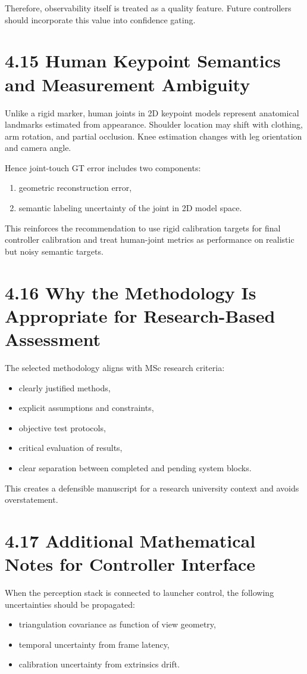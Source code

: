 Therefore, observability itself is treated as a quality feature. Future controllers should incorporate this value into confidence gating.

\section{4.15 Human Keypoint Semantics and Measurement Ambiguity}
Unlike a rigid marker, human joints in 2D keypoint models represent anatomical landmarks estimated from appearance. Shoulder location may shift with clothing, arm rotation, and partial occlusion. Knee estimation changes with leg orientation and camera angle.

Hence joint-touch GT error includes two components:
\begin{enumerate}
  \item geometric reconstruction error,
  \item semantic labeling uncertainty of the joint in 2D model space.
\end{enumerate}

This reinforces the recommendation to use rigid calibration targets for final controller calibration and treat human-joint metrics as performance on realistic but noisy semantic targets.

\section{4.16 Why the Methodology Is Appropriate for Research-Based Assessment}
The selected methodology aligns with MSc research criteria:
\begin{itemize}
  \item clearly justified methods,
  \item explicit assumptions and constraints,
  \item objective test protocols,
  \item critical evaluation of results,
  \item clear separation between completed and pending system blocks.
\end{itemize}

This creates a defensible manuscript for a research university context and avoids overstatement.



\section{4.17 Additional Mathematical Notes for Controller Interface}
When the perception stack is connected to launcher control, the following uncertainties should be propagated:
\begin{itemize}
  \item triangulation covariance as function of view geometry,
  \item temporal uncertainty from frame latency,
  \item calibration uncertainty from extrinsics drift.
\end{itemize}

